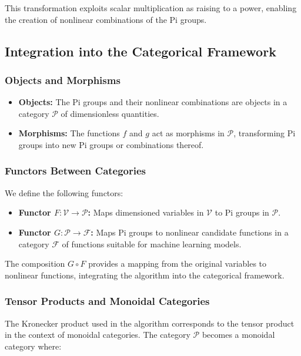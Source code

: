 \documentclass{article}
\theoremstyle{definition}
\theoremstyle{remark}
\begin{document}
This transformation exploits scalar multiplication as raising to a power, enabling the creation of nonlinear combinations of the Pi groups.

\subsection{Integration into the Categorical Framework}

\subsubsection{Objects and Morphisms}

\begin{itemize}
	\item \textbf{Objects:} The Pi groups and their nonlinear combinations are objects in a category $\mathcal{P}$ of dimensionless quantities.
	\item \textbf{Morphisms:} The functions $f$ and $g$ act as morphisms in $\mathcal{P}$, transforming Pi groups into new Pi groups or combinations thereof.
\end{itemize}

\subsubsection{Functors Between Categories}

We define the following functors:

\begin{itemize}
	\item \textbf{Functor $F: \mathcal{V} \rightarrow \mathcal{P}$:} Maps dimensioned variables in $\mathcal{V}$ to Pi groups in $\mathcal{P}$.
	\item \textbf{Functor $G: \mathcal{P} \rightarrow \mathcal{F}$:} Maps Pi groups to nonlinear candidate functions in a category $\mathcal{F}$ of functions suitable for machine learning models.
\end{itemize}

The composition $G \circ F$ provides a mapping from the original variables to nonlinear functions, integrating the algorithm into the categorical framework.

\subsubsection{Tensor Products and Monoidal Categories}

The Kronecker product used in the algorithm corresponds to the tensor product in the context of monoidal categories. The category $\mathcal{P}$ becomes a monoidal category where:
\end{document}
